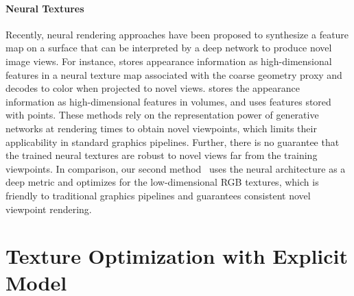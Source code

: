 \paragraph*{Neural Textures}
Recently, neural rendering approaches have been proposed to synthesize a feature map on a surface that can be interpreted by a deep network to produce novel image views.  For instance, \cite{thies2019deferred} stores appearance information as high-dimensional features in a neural texture map associated with the coarse geometry proxy and decodes to color when projected to novel views.  \cite{sitzmann2019deepvoxels} stores the appearance information as high-dimensional features in volumes, and \cite{aliev2019neural} uses features stored with points. These methods rely on the representation power of generative networks at rendering times to obtain novel viewpoints, which limits their applicability in standard graphics pipelines. Further, there is no guarantee that the trained neural textures are robust to novel views far from the training viewpoints. In comparison, our second method~\cite{huang2020adversarial} uses the neural architecture as a deep metric and optimizes for the low-dimensional RGB textures, which is friendly to traditional graphics pipelines and guarantees consistent novel viewpoint rendering.


\section{Texture Optimization with Explicit Model}
\label{sec:toptim}

